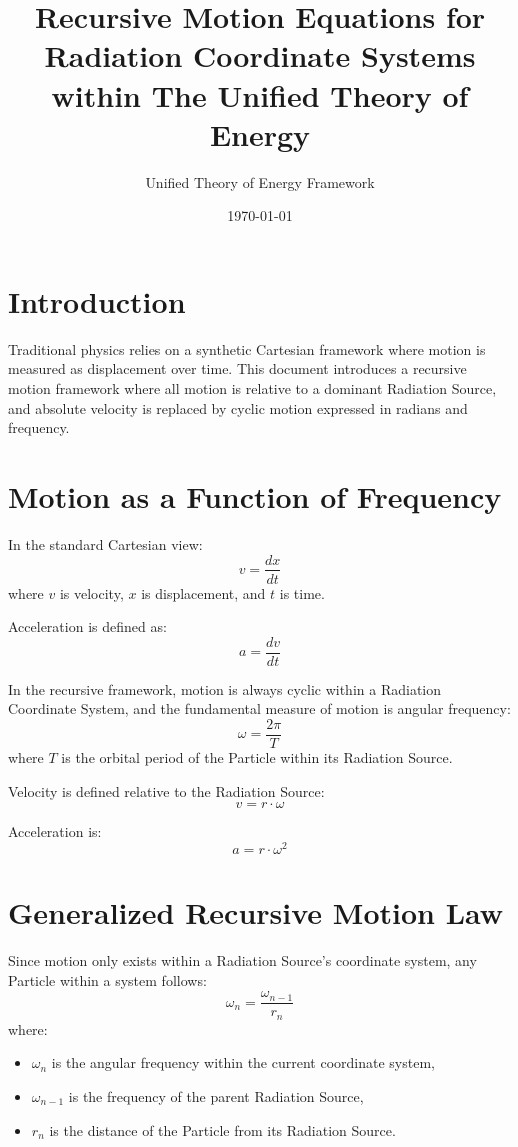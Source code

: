\documentclass{article}
\title{Recursive Motion Equations for Radiation Coordinate Systems within The Unified Theory of Energy}
\author{Unified Theory of Energy Framework}
\date{\today}
\begin{document}
\maketitle

\section{Introduction}
Traditional physics relies on a synthetic Cartesian framework where motion is measured as displacement over time. This document introduces a recursive motion framework where all motion is relative to a dominant Radiation Source, and absolute velocity is replaced by cyclic motion expressed in radians and frequency.

\section{Motion as a Function of Frequency}
In the standard Cartesian view:
\begin{equation}
    v = \frac{dx}{dt}
\end{equation}
where $v$ is velocity, $x$ is displacement, and $t$ is time.

Acceleration is defined as:
\begin{equation}
    a = \frac{dv}{dt}
\end{equation}

In the recursive framework, motion is always cyclic within a Radiation Coordinate System, and the fundamental measure of motion is angular frequency:
\begin{equation}
    \omega = \frac{2\pi}{T}
\end{equation}
where $T$ is the orbital period of the Particle within its Radiation Source.

Velocity is defined relative to the Radiation Source:
\begin{equation}
    v = r \cdot \omega
\end{equation}

Acceleration is:
\begin{equation}
    a = r \cdot \omega^2
\end{equation}

\section{Generalized Recursive Motion Law}
Since motion only exists within a Radiation Source’s coordinate system, any Particle within a system follows:
\begin{equation}
    \omega_n = \frac{\omega_{n-1}}{r_n}
\end{equation}
where:
\begin{itemize}
    \item $\omega_n$ is the angular frequency within the current coordinate system,
    \item $\omega_{n-1}$ is the frequency of the parent Radiation Source,
    \item $r_n$ is the distance of the Particle from its Radiation Source.
\end{itemize}
\end{document}
